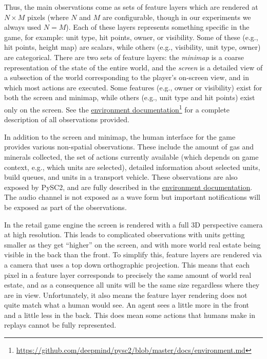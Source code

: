 Thus, the main observations come as sets of feature layers which are rendered at $N\times M$ pixels (where $N$ and $M$ are configurable, though in our experiments we always used $N=M$). Each of these layers represents something specific in the game, for example: unit type, hit points, owner, or visibility. Some of these (e.g., hit points, height map) are scalars, while others (e.g., visibility, unit type, owner) are categorical. There are two sets of feature layers: the \emph{minimap} is a coarse representation of the state of the entire world, and the \emph{screen} is a detailed view of a subsection of the world corresponding to the player's on-screen view, and in which most actions are executed. Some features (e.g., owner or visibility) exist for both the screen and minimap, while others (e.g., unit type and hit points) exist only on the screen. See the \href{https://github.com/deepmind/pysc2/blob/master/docs/environment.md}{environment documentation}\footnote{\url{https://github.com/deepmind/pysc2/blob/master/docs/environment.md}} for a complete description of all observations provided.

In addition to the screen and minimap, the human interface for the game provides various non-spatial observations. These include the amount of gas and minerals collected, the set of actions currently available (which depends on game context, e.g., which units are selected), detailed information about selected units, build queues, and units in a transport vehicle. These observations are also exposed by PySC2, and are fully described in the \href{https://github.com/deepmind/pysc2/blob/master/docs/environment.md}{environment documentation}. The audio channel is not exposed as a wave form but important notifications will be exposed as part of the observations.

In the retail game engine the screen is rendered with a full 3D perspective camera at high resolution. This leads to complicated observations with units getting smaller as they get ``higher'' on the screen, and with more world real estate being visible in the back than the front. To simplify this, feature layers are rendered via a camera that uses a top down orthographic projection. This means that each pixel in a feature layer corresponds to precisely the same amount of world real estate, and as a consequence all units will be the same size regardless where they are in view. Unfortunately, it also means the feature layer rendering does not quite match what a human would see. An agent sees a little more in the front and a little less in the back. This does mean some actions that humans make in replays cannot be fully represented.


